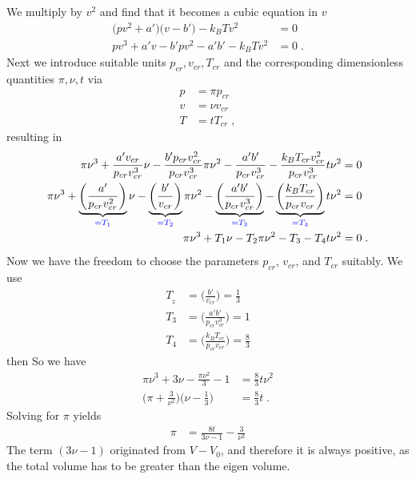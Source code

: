 We multiply  by $v^{2}$ and find that it becomes a cubic equation in $v$
%
\begin{align*}
\bigg( p v^{2}+ a' \bigg)\bigg(v -  b' \bigg) - k_{B} T v^{2}&= 0\\
p v^{3} + a' v   -  b' p v^{2} - a' b' - k_{B} T v^{2}&= 0\;.
\end{align*}
%
Next we introduce suitable units $p_{cr},v_{cr},T_{cr}$ and the corresponding dimensionless 
quantities $\pi,\nu,t$ via
%
\begin{align*}
p &=\pi p_{cr}\\
v &=\nu v_{cr}\\
T &= t T_{cr}\;,
\end{align*}
%
resulting in 
%
\begin{align*}
\pi \nu^{3} + \frac{a' v_{cr}}{p_{cr} v_{cr}^{3} } \nu -\frac{b' p_{cr}  v_{cr}^{2}}{p_{cr} v_{cr}^{3} } \pi \nu^{2}
-\frac{a'b'}{p_{cr} v_{cr}^{3} } - \frac{k_{B}T_{cr} v_{cr}^{2}}{p_{cr} v_{cr}^{3} } t \nu^{2}&=0 \\
\pi \nu^{3} + \underbrace{
\bigg(\frac{a' }{p_{cr} v_{cr}^{2} }\bigg) 
}_{\color{blue} = T_{1}}\nu
 -\underbrace{
\bigg(\frac{b'  }{ v_{cr} }\bigg) 
}_{\color{blue} = T_{2}}\pi \nu^{2}
-\underbrace{
\bigg(\frac{a'b'}{p_{cr} v_{cr}^{3} }\bigg)
}_{\color{blue} = T_{3}} - 
\underbrace{
\bigg(\frac{k_{B}T_{cr} }{p_{cr} v_{cr} } \bigg)
}_{\color{blue} = T_{4}}
t \nu^{2}&=0 \\
\pi \nu^{3} + T_{1}\nu - T_{2} \pi \nu^{2}
-T_{3} - T_{4} t \nu^{2}&=0 \;.
\end{align*}
%
Now we have the freedom to choose the parameters $p_{cr}$, $v_{cr}$, and $T_{cr}$ suitably.
We use
%
\begin{align}
T_{_{2}} &=\bigg(\frac{b'  }{ v_{cr} }\bigg)= \frac{1}{3}\\
T_{3}&= \bigg(\frac{a'b'}{p_{cr} v_{cr}^{3} }\bigg) =1\\
T_{4}&=\bigg(\frac{k_{B}T_{cr} }{p_{cr} v_{cr} } \bigg)= \frac{8}{3}
\end{align}
%
then
%
So we have
%
\begin{align}\label{eq:auxaux}
\pi \nu^{3} + 3 \nu -  \frac{\pi \nu^{2}}{3} - 1 &= \frac{8}{3}t \nu^{2}\\
\bigg( \pi + \frac{3}{\nu^{2}} \bigg)\bigg( \nu - \frac{1}{3} \bigg) &=\frac{8}{3} t\;.
\end{align}
%
Solving for $\pi$ yields
%
\begin{align*}
\pi &= \frac{8t}{3 \nu-1 } - \frac{3}{\nu^{2}}
\end{align*}
%
The term $(3\nu-1)$ originated from $V-V_{0}$, and therefore it is always positive,
as the total volume has to be greater than the eigen volume. 

